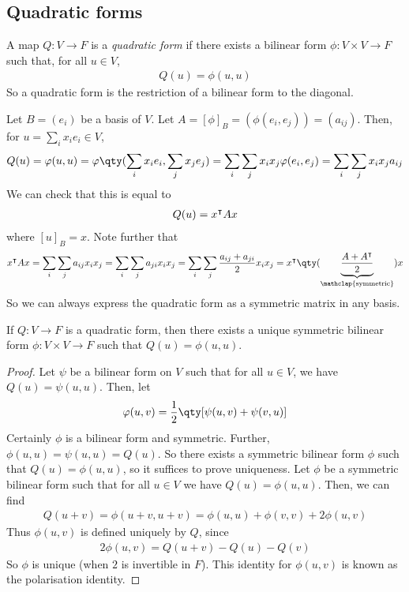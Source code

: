 \subsection{Quadratic forms}
\begin{definition}
	A map $Q \colon V \to F$ is a \textit{quadratic form} if there exists a bilinear form $\phi \colon V \times V \to F$ such that, for all $u \in V$,
	\begin{align*}
		Q(u) = \phi(u,u)
	\end{align*}
	So a quadratic form is the restriction of a bilinear form to the diagonal.
\end{definition}
\begin{remark}
	Let $B = (e_i)$ be a basis of $V$.
	Let $A = [\phi]_B = (\phi(e_i, e_j)) = (a_{ij})$.
	Then, for $u = \sum_i x_i e_i \in V$,
	\begin{align*}
		Q(u) = \phi(u,u) = \phi\qty(\sum_i x_i e_i, \sum_j x_j e_j) = \sum_i \sum_j x_i x_j \phi(e_i, e_j) = \sum_i \sum_j x_i x_j a_{ij}
	\end{align*}
	We can check that this is equal to
	\begin{align*}
		Q(u) = x^\intercal A x
	\end{align*}
	where $[u]_B = x$.
	Note further that
	\begin{align*}
		x^\transpose A x = \sum_i \sum_j a_{ij} x_i x_j = \sum_i \sum_j a_{ji} x_i x_j = \sum_i \sum_j \frac{a_{ij} + a_{ji}}{2} x_i x_j = x^\transpose \qty(\underbrace{\frac{A + A^\transpose}{2}}_{\mathclap{\text{symmetric}}}) x
	\end{align*}
	So we can always express the quadratic form as a symmetric matrix in any basis.
\end{remark}
\begin{proposition}
	If $Q \colon V \to F$ is a quadratic form, then there exists a unique symmetric bilinear form $\phi \colon V \times V \to F$ such that $Q(u) = \phi(u,u)$.
\end{proposition}
\begin{proof}
	Let $\psi$ be a bilinear form on $V$ such that for all $u \in V$, we have $Q(u) = \psi(u,u)$.
	Then, let
	\begin{align*}
		\phi(u,v) = \frac{1}{2}\qty[\psi(u,v) + \psi(v,u)]
	\end{align*}
	Certainly $\phi$ is a bilinear form and symmetric.
	Further, $\phi(u,u) = \psi(u,u) = Q(u)$.
	So there exists a symmetric bilinear form $\phi$ such that $Q(u) = \phi(u,u)$, so it suffices to prove uniqueness.
	Let $\phi$ be a symmetric bilinear form such that for all $u \in V$ we have $Q(u) = \phi(u,u)$.
	Then, we can find
	\begin{align*}
		Q(u + v) = \phi(u + v, u + v) = \phi(u,u) + \phi(v,v) + 2\phi(u,v)
	\end{align*}
	Thus $\phi(u,v)$ is defined uniquely by $Q$, since
	\begin{align*}
		2 \phi(u,v) = Q(u+v) - Q(u) - Q(v)
	\end{align*}
	So $\phi$ is unique (when $2$ is invertible in $F$).
	This identity for $\phi(u,v)$ is known as the polarisation identity.
\end{proof}

